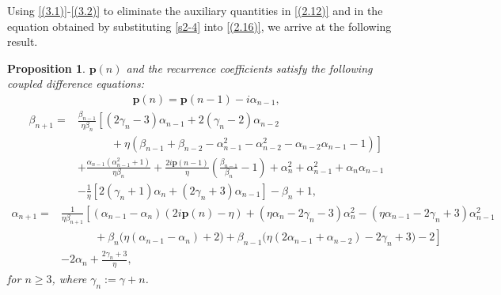 \documentclass[11pt,a4paper]{article}
\newtheorem{proposition}[theorem]{Proposition}
\numberwithin{equation}{section}
\begin{document}
Using \eqref{(3.1)}-\eqref{(3.2)} to eliminate the auxiliary quantities in \eqref{(2.12)} and in the equation obtained by substituting \eqref{s2-4} into \eqref{(2.16)}, we arrive at the following result.
	\begin{proposition}
		$\textbf{p}(n)$ and the recurrence coefficients satisfy the following coupled difference equations:
	\begin{align}\label{diffpn-1}
			 \textbf{p}(n)=\textbf{p}(n-1)-\mathit{i}\alpha_{n-1},
	\end{align}
\begin{equation}\label{diffbt-1}
\begin{aligned}
			\beta_{n+1}
=& \frac{\beta_{n-1}}{\eta\beta_{n}}\left[(2\gamma_{n}-3)\alpha_{n-1}+2(\gamma_{n}-2)\alpha_{n-2}\right.\\
&\left.\qquad\quad+\eta\left(\beta_{n-1}+\beta_{n-2}-\alpha_{n-1}^2-\alpha_{n-2}^2-\alpha_{n-2}\alpha_{n-1}-1\right)\right]\\
&+\frac{\alpha_{n-1}(\alpha_{n-1}^2+1) }{\eta\beta_{n}}+\frac{2i\textbf{p}(n-1)}{\eta}\left(\frac{\beta_{n-1}}{\beta_{n}}-1\right)+\alpha_{n}^2+\alpha_{n-1}^2+\alpha_{n}\alpha_{n-1}\\
&-\frac{1}{\eta}\left[2(\gamma_{n}+1)\alpha_{n}+(2\gamma_{n}+3)\alpha_{n-1}\right]-\beta_{n}+1,
\end{aligned}
\end{equation}
\begin{equation}\label{diffal-1}
\begin{aligned} \alpha_{n+1}=&\frac{1}{\eta\beta_{n+1}}\left[\left(\alpha_{n-1}-\alpha_{n}\right)\left(2\mathit{i}\textbf{p}(n)-\eta\right)+\left(\eta\alpha_{n}-2\gamma_{n}-3\right)\alpha_{n}^2-\left(\eta\alpha_{n-1}-2\gamma_{n}+3\right)\alpha_{n-1}^2\right.\\
&\left.\qquad\quad			 +\beta_{n}\big(\eta(\alpha_{n-1}-\alpha_{n})+2\big)+\beta_{n-1}\big(\eta (2\alpha_{n-1}+\alpha_{n-2})-2\gamma_{n}+3\big)-2\right]\\
&-2\alpha_{n}+\frac{2\gamma_{n}+3}{\eta},
\end{aligned}
\end{equation}	
for $n\geq3$, where $\gamma_{n}:=\gamma+n$.
	\end{proposition}
\end{document}
